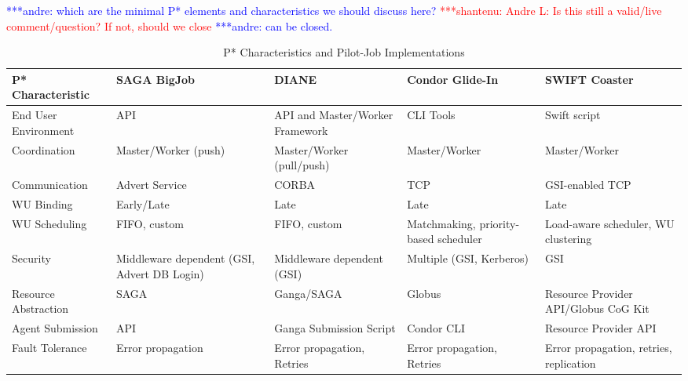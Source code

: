 \documentclass[conference,final]{IEEEtran}
\newcommand{\jhanote}[1]{ {\textcolor{red} { ***shantenu: #1 }}}
\newcommand{\alnote}[1]{ {\textcolor{blue} { ***andre: #1 }}}
\newcommand{\alnote}[1]{}
\newcommand{\jhanote}[1]{}
\begin{document}

\alnote{which are the minimal P* elements and characteristics we
  should discuss here?}  \jhanote{Andre L: Is this still a valid/live
  comment/question? If not, should we close}\alnote{can be closed.}

\begin{table}[t]
\centering
\begin{tabular}{|l|p{2.5cm}|p{2.5cm}|p{2.5cm}|p{2.5cm}|}
	\hline
	\textbf{P* Characteristic}
	&\textbf{SAGA BigJob} &\textbf{DIANE} &\textbf{Condor Glide-In} &   
	\textbf{SWIFT Coaster} \\ \hline
End User Environment &API &API and Master/Worker Framework &CLI Tools &Swift script\\ \hline

Coordination &Master/Worker (push) &Master/Worker (pull/push) &Master/Worker &Master/Worker \\ \hline
	
Communication &Advert Service &CORBA &TCP &GSI-enabled TCP \\ \hline

WU Binding &Early/Late &Late &Late &Late\\
\hline
WU Scheduling &FIFO, custom &FIFO, custom &Matchmaking, priority-based scheduler 
&Load-aware scheduler, WU clustering\\
\hline

Security &Middleware dependent (GSI, Advert DB Login) &Middleware dependent (GSI) &Multiple (GSI, 
Kerberos) &GSI\\ \hline

Resource Abstraction &SAGA &Ganga/SAGA &Globus &Resource Provider API/Globus CoG 
Kit \\ 
\hline
Agent Submission &API &Ganga Submission Script &Condor CLI 
&Resource Provider API\\
\hline
Fault Tolerance &Error propagation &Error propagation, Retries &Error propagation, Retries &Error propagation, retries, replication\\
\hline
	
\end{tabular}
\caption{P* Characteristics and Pilot-Job Implementations}\label{table:pilot-job-comparison}
\end{table}
\end{document}
